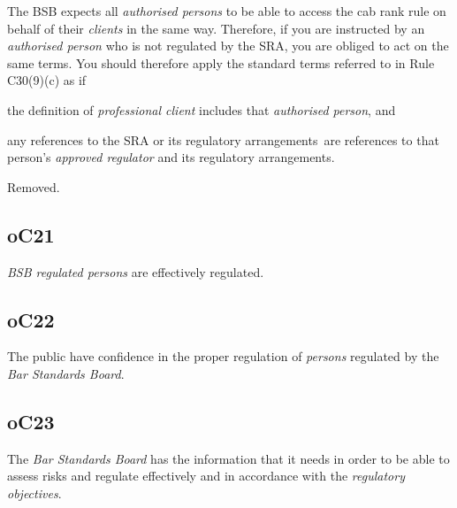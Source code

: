 The BSB expects all \emph{authorised persons} to be able to access the
cab rank rule on behalf of their \emph{clients} in the same way.
Therefore, if you are instructed by an \emph{authorised person} who is
not regulated by the SRA, you are obliged to act on the same terms. You
should therefore apply the standard terms referred to in Rule C30(9)(c) as
if \begin{romlist}
\item the definition of \emph{professional client} includes that
\emph{authorised person}, and \item any references to the SRA or its
regulatory arrangements~are references to that person's \emph{approved
regulator} and its regulatory arrangements.\end{romlist}



Removed.




\subsection{\color{bleu}oC21}

\emph{BSB regulated persons} are effectively regulated.

\subsection{\color{bleu}oC22}

The public have confidence in the proper regulation of \emph{persons}
regulated by the \emph{Bar Standards Board}.

\subsection{\color{bleu}oC23}

The \emph{Bar Standards Board} has the information that it needs in
order to be able to assess risks and regulate effectively and in
accordance with the \emph{regulatory objectives}.




